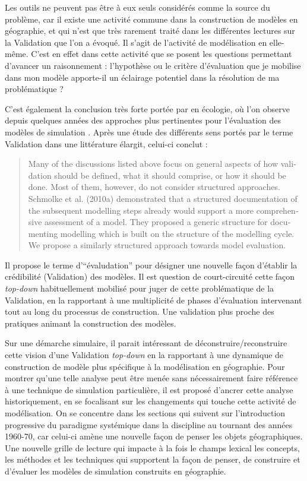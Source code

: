 Les outils ne peuvent pas être à eux seuls considérés comme la source du problème, car il existe une activité commune dans la construction de modèles en géographie, et qui n'est que très rarement traité dans les différentes lectures sur la Validation que l'on a évoqué. Il s'agit de l'activité de modélisation en elle-même. C'est en effet dans cette activité que se posent les questions permettant d'avancer un raisonnement : l'hypothèse ou le critère d'évaluation que je mobilise dans mon modèle apporte-il un éclairage potentiel dans la résolution de ma problématique ?


C'est également la conclusion très forte portée par \textcite{Augusiak2014} en écologie, où l'on observe depuis quelques années des approches plus pertinentes pour l'évaluation des modèles de simulation \autocites{Grimm2005,Grimm2010}. Après une étude des différents sens portés par le terme Validation dans une littérature élargit, celui-ci conclut : \foreignblockquote{english}[{\cite[120]{Augusiak2014}}]{Many of the discussions listed above focus on general aspects of how validation should be defined, what it should comprise, or how it should be done. Most of them, however, do not consider structured approaches. Schmolke et al. (2010a) demonstrated that a structured documentation of the subsequent modelling steps already would support a more comprehensive assessment of a model. They proposed a generic structure for documenting modelling which is built on the structure of the modelling cycle. We propose a similarly structured approach towards model evaluation.}

Il propose le terme d'\enquote{évaludation} pour désigner une nouvelle façon d'établir la crédibilité (Validation) des modèles. Il est question de court-circuité cette façon \textit{top-down} habituellement mobilisé pour juger de cette problématique de la Validation, en la rapportant à une multiplicité de phases d'évaluation intervenant tout au long du processus de construction. Une validation plus proche des pratiques animant la construction des modèles.

Sur une démarche simulaire, il parait intéressant de déconstruire/reconstruire cette vision d'une Validation \textit{top-down} en la rapportant à une dynamique de construction de modèle plus spécifique à la modélisation en géographie. Pour montrer qu'une telle analyse peut être menée sans nécessairement faire référence à une technique de simulation particulière, il est proposé d'ancrer cette analyse historiquement, en se focalisant sur les changements qui touche cette activité de modélisation. On se concentre dans les sections qui suivent sur l'introduction progressive du paradigme systémique dans la discipline au tournant des années 1960-70, car celui-ci amène une nouvelle façon de penser les objets géographiques. Une nouvelle grille de lecture qui impacte à la fois le champs lexical les concepts, les méthodes et les techniques qui supportent la façon de penser, de construire et d'évaluer les modèles de simulation construits en géographie.
